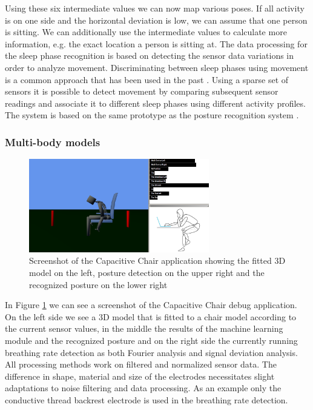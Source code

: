Using these six intermediate values we can now map various poses. If all activity is on one side and the horizontal deviation is low, we can assume that one person is sitting. We can additionally use the intermediate values to calculate more information, e.g. the exact location a person is sitting at. 
The data processing for the sleep phase recognition is based on detecting the sensor data variations in order to analyze movement. Discriminating between sleep phases using movement is a common approach that has been used in the past \cite{salmi86}. Using a sparse set of sensors it is possible to detect movement by comparing subsequent sensor readings and associate it to different sleep phases using different activity profiles. The system is based on the same prototype as the posture recognition system \cite{Djakow2013movibed}.
\subsubsection{Multi-body models}
\begin{figure}[h]
\centering
\includegraphics[width=0.7\textwidth]{images/smartchair_software}
\caption{Screenshot of the Capacitive Chair application showing the fitted 3D model on the left, posture detection on the upper right and the recognized posture on the lower right}
\label{fig:smartchair_software}
\end{figure}
In Figure \ref{fig:smartchair_software} we can see a screenshot of the Capacitive Chair debug application. On the left side we see a 3D model that is fitted to a chair model according to the current sensor values, in the middle the results of the machine learning module and the recognized posture and on the right side the currently running breathing rate detection as both Fourier analysis and signal deviation analysis.
All processing methods work on filtered and normalized sensor data. The difference in shape, material and size of the electrodes necessitates slight adaptations to noise filtering and data processing. As an example only the conductive thread backrest electrode is used in the breathing rate detection. 
